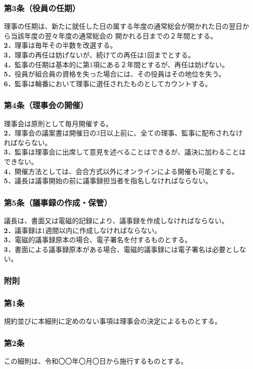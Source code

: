 \documentclass[12pt,uplatex]{jsarticle}
\begin{document}
\subsubsection*{ 第3条（役員の任期）}
理事の任期は、新たに就任した日の属する年度の通常総会が開かれた日の翌日から当該年度の翌々年度の通常総会の
開かれる日までの２年間とする。\\
\textbf{2．}理事は毎年その半数を改選する。\\
\textbf{3．}理事の再任は妨げないが、続けての再任は1回までとする。\\
\textbf{4．}監事の任期は基本的に第1項にある２年間とするが、再任は妨げない。\\
\textbf{5．}役員が組合員の資格を失った場合には、その役員はその地位を失う。\\
\textbf{6．}監事は輪番において理事に選任されたものとしてカウントする。\\

\subsubsection*{ 第4条（理事会の開催）}
理事会は原則として毎月開催する。\\
\textbf{2．}理事会の議案書は開催日の3日以上前に、全ての理事、監事に配布されなければならない。\\
\textbf{3．}監事は理事会に出席して意見を述べることはできるが、議決に加わることはできない。\\
\textbf{4．}開催方法としては、会合方式以外にオンラインによる開催も可能とする。\\
\textbf{5．}議長は議事開始の前に議事録担当者を指名しなければならない。\\


\subsubsection*{ 第5条（議事録の作成・保管）}
議長は、書面又は電磁的記録により、議事録を作成しなければならない。\\
\textbf{2．}議事録は1週間以内に作成しなければならない。\\
\textbf{3．}電磁的議事録原本の場合、電子署名を付するものとする。\\
\textbf{3．}書面による議事録原本がある場合、電磁的議事録には電子署名は必要としない。\\


\begin{center}
\subsubsection*{附則}
\end{center}
\subsubsection*{第1条}
規約並びに本細則に定めのない事項は理事会の決定によるものとする。
\subsubsection*{第2条}
この細則は、令和〇〇年〇月〇日から施行するものとする。
\end{document}
